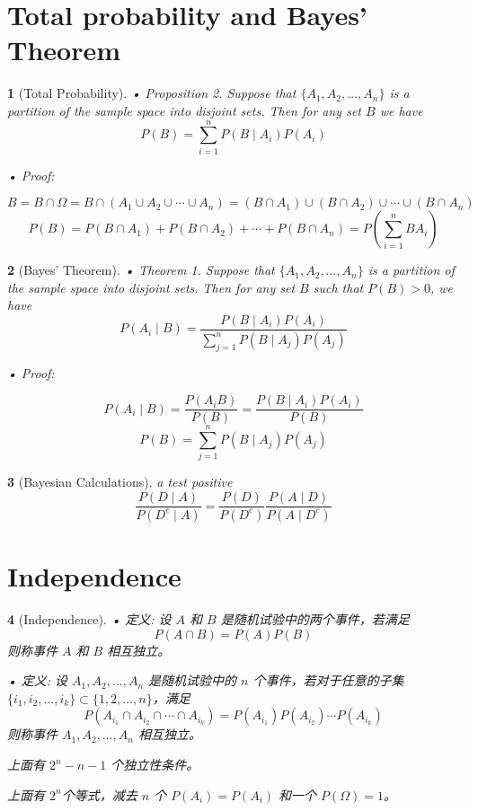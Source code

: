 \documentclass[UTF8]{report}
\theoremstyle{MyLineTheoremStyle} %
\theoremstyle{MyBlockTheoremStyle} %
\theoremstyle{MySubsubsectionStyle} %
\newtheorem{definition}{}
\begin{document}
\section{Total probability and Bayes' Theorem}
\begin{definition}[Total Probability]
    • Proposition 2. Suppose that \(\{A_1, A_2, \ldots, A_n\}\) is a partition of the sample space into disjoint sets. Then for any set \(B\) we have
    \[
    P(B) = \sum_{i=1}^{n} P(B \mid A_i) P(A_i)
    \]\par
    • Proof: \par
    \[
    B = B \cap \Omega = B \cap (A_1 \cup A_2 \cup \cdots \cup A_n) = (B \cap A_1) \cup (B \cap A_2) \cup \cdots \cup (B \cap A_n)
    \]
    \[
    P(B) = P(B \cap A_1) + P(B \cap A_2) + \cdots + P(B \cap A_n) = P(\sum_{i=1}^{n} BA_i)
    \]
\end{definition}

\begin{definition}[Bayes' Theorem]
    • Theorem 1. Suppose that \(\{A_1, A_2, \ldots, A_n\}\) is a partition of the sample space into disjoint sets. Then for any set \(B\) such that \(P(B) > 0\), we have
    \[
    P(A_i \mid B) = \frac{P(B \mid A_i) P(A_i)}{\sum_{j=1}^{n} P(B \mid A_j) P(A_j)}
    \]\par
    • Proof: \par
    \[
    P(A_i \mid B) = \frac{P(A_i B)}{P(B)} = \frac{P(B \mid A_i) P(A_i)}{P(B)}
    \]
    \[
    P(B) = \sum_{j=1}^{n} P(B \mid A_j) P(A_j)
    \]
\end{definition}

\begin{definition}[Bayesian Calculations]
    a test positive
    \[
    \frac{P(D \mid A)}{P(D^c \mid A)} = \frac{P(D)}{P(D^c)} \frac{P(A \mid D)}{P(A \mid D^c)}
    \]
\end{definition}

\section{Independence}
\begin{definition}[Independence]
    • 定义: 设 \(A\) 和 \(B\) 是随机试验中的两个事件，若满足
    \[
    P(A \cap B) = P(A)P(B)
    \]
    则称事件 \(A\) 和 \(B\) 相互独立。\par
    • 定义: 设 \(A_1, A_2, \ldots, A_n\) 是随机试验中的 \(n\) 个事件，若对于任意的子集 \(\{i_1, i_2, \ldots, i_k\} \subset \{1, 2, \ldots, n\}\)，满足
    \[
    P(A_{i_1} \cap A_{i_2} \cap \cdots \cap A_{i_k}) = P(A_{i_1}) P(A_{i_2}) \cdots P(A_{i_k})
    \]
    则称事件 \(A_1, A_2, \ldots, A_n\) 相互独立。\par
    上面有 \(2^n - n - 1\) 个独立性条件。\par
    上面有 \(2^n\)个等式，减去 \(n\) 个 \(P(A_i) = P(A_i)\) 和一个 \(P(\Omega) = 1\)。
\end{definition}
\end{document}
